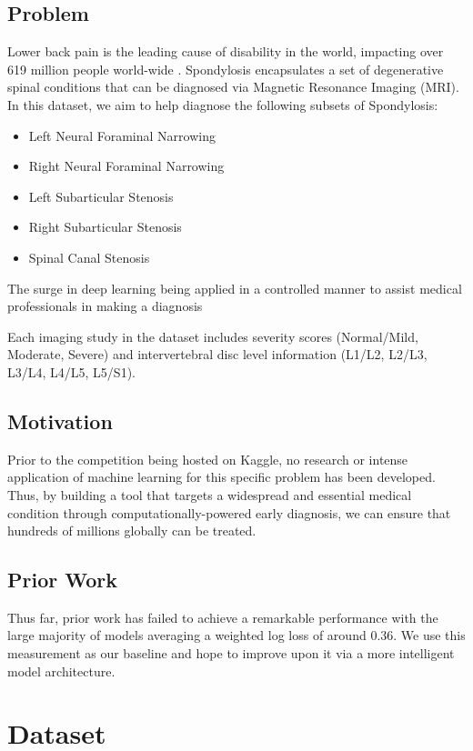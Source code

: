 \documentclass[conference]{IEEEtran}
\begin{document}
\subsection{Problem}
Lower back pain is the leading cause of disability in the world, impacting over 619 million people world-wide \cite{WHO}. Spondylosis encapsulates a set of degenerative spinal conditions that can be diagnosed via Magnetic Resonance Imaging (MRI). In this dataset, we aim to help diagnose the following subsets of Spondylosis:
\begin{itemize}
    \item Left Neural Foraminal Narrowing
    \item Right Neural Foraminal Narrowing
    \item Left Subarticular Stenosis
    \item Right Subarticular Stenosis
    \item Spinal Canal Stenosis
\end{itemize}

The surge in deep learning being applied in a controlled manner to assist medical professionals in making a diagnosis

Each imaging study in the dataset includes severity scores (Normal/Mild, Moderate, Severe) and intervertebral disc level information (L1/L2, L2/L3, L3/L4, L4/L5, L5/S1).

\subsection{Motivation}
Prior to the competition being hosted on Kaggle, no research or intense application of machine learning for this specific problem has been developed. Thus, by building a tool that targets a widespread and essential medical condition through computationally-powered early diagnosis, we can ensure that hundreds of millions globally can be treated.

\subsection{Prior Work}
Thus far, prior work has failed to achieve a remarkable performance with the large majority of models averaging a weighted log loss of around 0.36. We use this measurement as our baseline and hope to improve upon it via a more intelligent model architecture.

\section{Dataset}
\end{document}
